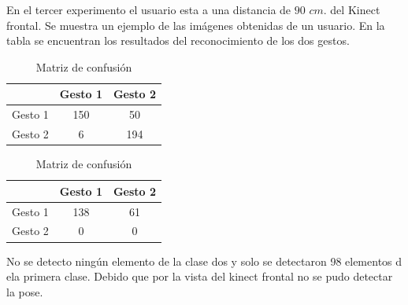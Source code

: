 
En el tercer experimento el usuario esta a una distancia de $90$ $cm.$ del Kinect frontal. Se muestra un ejemplo de las imágenes obtenidas de un usuario. En la tabla se encuentran los resultados del reconocimiento de los dos gestos.    


\begin{table}[h!] 
\begin{center}
\begin{tabular}{ r || c | c |} 
 
        & Gesto 1 & Gesto 2 \\ \hline \hline  
Gesto 1 & 150     &  50     \\ \hline  
Gesto 2 & 6      &  194     \\   

\end{tabular}
\end{center} 
\caption{Matriz de confusión}
\end{table}

\begin{table}[h!] 
\begin{center}
\begin{tabular}{ r || c | c |} 
 
        & Gesto 1 & Gesto 2 \\ \hline \hline  
Gesto 1 & 138     &  61     \\ \hline  
Gesto 2 & 0      &  0     \\   

\end{tabular}
\end{center} 
\caption{Matriz de confusión}
\end{table} 

No se detecto ningún elemento de la clase dos y solo se detectaron 98 elementos d ela primera clase. Debido que por la vista del kinect frontal no se pudo detectar la pose. 

